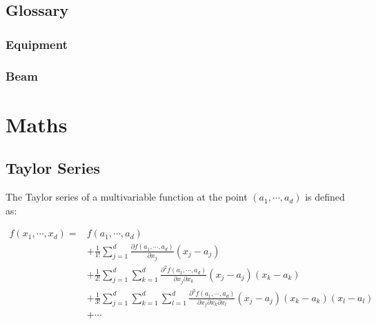 \documentclass[12pt,a4,]{article}
\numberwithin{equation}{subsection}
\begin{document}
\newpage

\hypertarget{glossary}{%
\subsection{Glossary}\label{glossary}}

\renewcommand{\glossarysection}[2][]{}
\renewcommand*{\glspostdescription}{\vspace{-8pt}}
\glsnoexpandfields

\hypertarget{equipment}{%
\subsubsection{Equipment}\label{equipment}}

\glsaddall
\vspace{-6\parskip}
\printglossary[type=equipment]

\hypertarget{beam}{%
\subsubsection{Beam}\label{beam}}

\glsaddall
\vspace{-6\parskip}
\printglossary[type=beam]

\newpage

\hypertarget{maths}{%
\section{Maths}\label{maths}}

\hypertarget{taylor-series}{%
\subsection{Taylor Series}\label{taylor-series}}

The Taylor series of a multivariable function at the point
\((a_1, \cdots, a_d)\) is defined as:

\begin{equation}\begin{aligned}
  f(x_1, \cdots, x_d) = &f(a_1, \cdots, a_d) \\
                &+ \frac{1}{1!} \sum_{j=1}^{d} \frac{\partial f(a_1, \cdots, a_d)}{\partial x_j} (x_j - a_j) \\
                &+ \frac{1}{2!}\sum_{j=1}^{d}\sum_{k=1}^{d} \frac{\partial^2 f(a_1, \cdots, a_d)}{\partial x_j\partial x_k} (x_j - a_j) (x_k - a_k) \\
                &+ \frac{1}{3!}\sum_{j=1}^{d}\sum_{k=1}^{d}\sum_{l=1}^{d} \frac{\partial^3 f(a_1, \cdots, a_d)}{\partial x_j\partial x_k\partial x_l} (x_j - a_j) (x_k - a_k) (x_l - a_l)\\
                &+ \cdots
\end{aligned}\label{eq:taylor}\end{equation}
\end{document}
